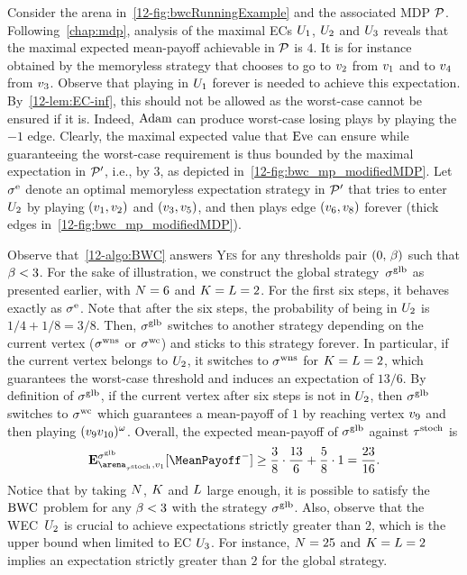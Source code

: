 \begin{example}
Consider the arena in~\cref{12-fig:bwcRunningExample} and the associated MDP ${\mathcal{P}}$. Following~\cref{chap:mdp}, analysis of the maximal ECs $U_{1}$, $U_{2}$ and $U_{3}$ reveals that the maximal expected mean-payoff achievable in ${\mathcal{P}}$ is $4$. It is for instance obtained by the memoryless strategy that chooses to go to $v_{2}$ from $v_{1}$ and to $v_{4}$ from $v_{3}$. Observe that playing in $U_{1}$ forever is needed to achieve this expectation. By~\cref{12-lem:EC-inf}, this should not be allowed as the worst-case cannot be ensured if it is. Indeed, $\text{Adam}$ can produce worst-case losing plays by playing the $-1$ edge. Clearly, the maximal expected value that $\text{Eve}$ can ensure while guaranteeing the worst-case requirement is thus bounded by the maximal expectation in ${\mathcal{P}}'$, i.e., by $3$, as depicted in~\cref{12-fig:bwc_mp_modifiedMDP}. Let $\sigma^{\text{e}}$ denote an optimal memoryless expectation strategy in ${\mathcal{P}}'$ that tries to enter~$U_{2}$ by playing $(v_{1}, v_{2})$ and $(v_{3}, v_{5})$, and then plays edge $(v_{6}, v_{8})$ forever (thick edges in~\cref{12-fig:bwc_mp_modifiedMDP}).



Observe that~\cref{12-algo:BWC} answers \textsc{Yes} for any thresholds pair $(0,\, \beta)$ such that $\beta < 3$. For the sake of illustration, we construct the global strategy~$\sigma^{\text{glb}}$ as presented earlier, with $N = 6$ and $K = L = 2$. For the first six steps, it behaves exactly as $\sigma^{\text{e}}$. Note that after the six steps, the probability of being in $U_{2}$ is $1/4 + 1/8 = 3/8$. Then, $\sigma^{\text{glb}}$ switches to another strategy depending on the current vertex ($\sigma^{\text{wns}}$ or $\sigma^{\text{wc}}$) and sticks to this strategy forever. In particular, if the current vertex belongs to $U_{2}$, it switches to $\sigma^{\text{wns}}$ for $K = L = 2$, which guarantees the worst-case threshold and induces an expectation of $13/6$. By definition of $\sigma^{\text{glb}}$, if the current vertex after six steps is not in $U_{2}$, then $\sigma^{\text{glb}}$ switches to $\sigma^{\text{wc}}$ which guarantees a mean-payoff of $1$ by reaching vertex $v_{9}$ and then playing $(v_{9}v_{10})^{\omega}$. Overall, the expected mean-payoff of $\sigma^{\text{glb}}$ against $\tau^{\text{stoch}}$ is
\begin{equation*}
\expv^{\stratGlobal}_{\arena_{\tau^\text{stoch}},v_{1}}[\MeanPayoff^{-}] \geq \dfrac{3}{8}\cdot\dfrac{13}{6} + \dfrac{5}{8}\cdot 1 = \dfrac{23}{16}.
\end{equation*}
Notice that by taking $N$, $K$ and $L$ large enough, it is possible to satisfy the $\text{BWC}$ problem for any $\beta < 3$ with the strategy $\sigma^{\text{glb}}$. Also, observe that the WEC~$U_{2}$ is crucial to achieve expectations strictly greater than $2$, which is the upper bound when limited to EC $U_{3}$. For instance, $N = 25$ and $K = L = 2$ implies an expectation strictly greater than $2$ for the global strategy.


\end{example}
